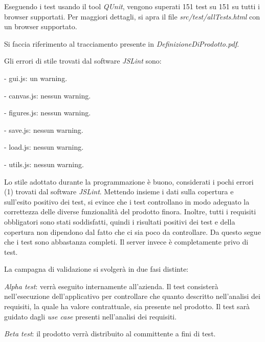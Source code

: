Eseguendo i test usando il tool \textit{QUnit}, vengono superati 151 test su 151 su tutti i browser supportati. Per maggiori dettagli, si apra il file \textit{src/test/allTests.html} con un browser supportato.

Si faccia riferimento al tracciamento presente in \textit{DefinizioneDiProdotto.pdf}.

Gli errori di stile trovati dal software \textit{JSLint} sono:
\begin{elencopuntato}[\subsubsecindent]
\item[-] gui.js: un warning.
\item[-] canvas.js: nessun warning.
\item[-] figures.js: nessun warning.
\item[-] save.js: nessun warning.
\item[-] load.js: nessun warning.
\item[-] utils.js: nessun warning.
\end{elencopuntato}

 Lo stile adottato durante la programmazione \`e buono, considerati i pochi errori (1) trovati dal software \textit{JSLint}. Mettendo insieme i dati sulla copertura e sull'esito positivo dei test, si evince che i test controllano in modo adeguato la correttezza delle diverse funzionalit\`a del prodotto finora. Inoltre, tutti i requisiti obbligatori sono stati soddisfatti, quindi i risultati positivi dei test e della copertura non dipendono dal fatto che ci sia poco da controllare. Da questo segue che i test sono abbastanza completi. Il server invece \`e completamente privo di test.

 
 
 
La campagna di validazione si svolger\`a in due fasi distinte:
\begin{elenconumerato}[\textbf{}]{\subsubsecindent}
\item \textit{Alpha test}: verr\`a eseguito internamente all'azienda. Il test consister\`a nell'esecuzione dell'applicativo per controllare che quanto descritto nell'analisi dei requisiti, la quale ha valore contrattuale, sia presente nel prodotto. Il test sar\`a guidato dagli \textit{use case} presenti nell'analisi dei requisiti.
\item \textit{Beta test}: il prodotto verr\`a distribuito al committente a fini di test.
\end{elenconumerato}
 

 
